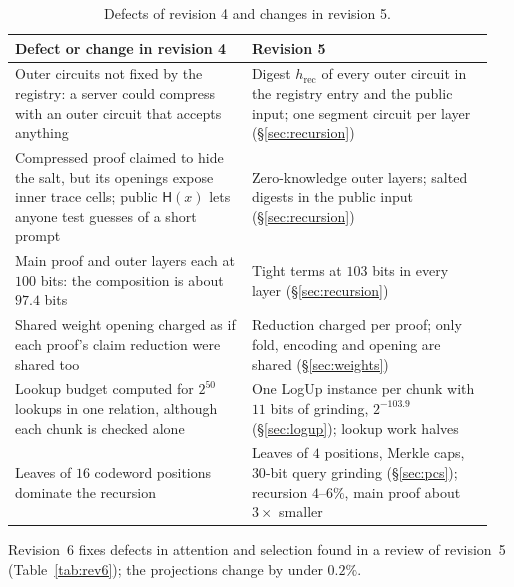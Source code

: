 \documentclass[11pt]{article}
\begin{document}
\begin{table}[h]
\centering\small
\begin{tabular}{@{}p{0.47\linewidth}p{0.48\linewidth}@{}}
\toprule
Defect or change in revision 4 & Revision 5 \\
\midrule
Outer circuits not fixed by the registry: a server could compress with an outer circuit that accepts anything & Digest \(h_{\mathrm{rec}}\) of every outer circuit in the registry entry and the public input; one segment circuit per layer (\S\ref{sec:recursion}) \\
Compressed proof claimed to hide the salt, but its openings expose inner trace cells; public \(\mathsf{H}(x)\) lets anyone test guesses of a short prompt & Zero-knowledge outer layers; salted digests in the public input (\S\ref{sec:recursion}) \\
Main proof and outer layers each at \(100\) bits: the composition is about \(97.4\) bits & Tight terms at \(103\) bits in every layer (\S\ref{sec:recursion}) \\
Shared weight opening charged as if each proof's claim reduction were shared too & Reduction charged per proof; only fold, encoding and opening are shared (\S\ref{sec:weights}) \\
\midrule
Lookup budget computed for \(2^{50}\) lookups in one relation, although each chunk is checked alone & One LogUp instance per chunk with \(11\) bits of grinding, \(2^{-103.9}\) (\S\ref{sec:logup}); lookup work halves \\
Leaves of \(16\) codeword positions dominate the recursion & Leaves of \(4\) positions, Merkle caps, \(30\)-bit query grinding (\S\ref{sec:pcs}); recursion \(4\)--\(6\%\), main proof about \(3\times\) smaller \\
\bottomrule
\end{tabular}
\caption{Defects of revision 4 and changes in revision 5.}
\label{tab:rev5}
\end{table}

Revision~6 fixes defects in attention and selection found in a review of revision~5 (Table~\ref{tab:rev6}); the projections change by under \(0.2\%\).
\end{document}
